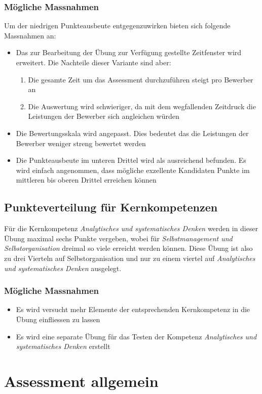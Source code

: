 \subsubsection{Mögliche Massnahmen}
Um der niedrigen Punkteausbeute entgegenzuwirken bieten sich folgende Massnahmen an:
\begin{itemize}
\item Das zur Bearbeitung der Übung zur Verfügung gestellte Zeitfenster wird erweitert. Die Nachteile dieser Variante sind aber:
\begin{enumerate}
\item Die gesamte Zeit um das Assessment durchzuführen steigt pro Bewerber an
\item Die Auswertung wird schwieriger, da mit dem wegfallenden Zeitdruck die Leistungen der Bewerber sich angleichen würden
\end{enumerate}
\item Die Bewertungsskala wird angepasst. Dies bedeutet das die Leistungen der Bewerber weniger streng bewertet werden
\item Die Punkteausbeute im unteren Drittel wird als ausreichend befunden. Es wird einfach angenommen, dass mögliche exzellente Kandidaten Punkte im mittleren bis oberen Drittel erreichen können
\end{itemize} 
\subsection{Punkteverteilung für Kernkompetenzen}
Für die Kernkompetenz \textit{Analytisches und systematisches Denken} werden in dieser Übung maximal sechs Punkte vergeben, wobei für \textit{Selbstmanagement und Selbstorganisation} dreimal so viele erreicht werden können. Diese Übung ist also zu drei Vierteln auf Selbstorganisation und nur zu einem viertel auf \textit{Analytisches und systematisches Denken} ausgelegt.
\subsubsection{Mögliche Massnahmen}
\begin{itemize}
\item Es wird versucht mehr Elemente der entsprechenden Kernkompetenz in die Übung einfliessen zu lassen
\item Es wird eine separate Übung für das Testen der Kompetenz \textit{Analytisches und systematisches Denken} erstellt
\end{itemize}


\section{Assessment allgemein}
